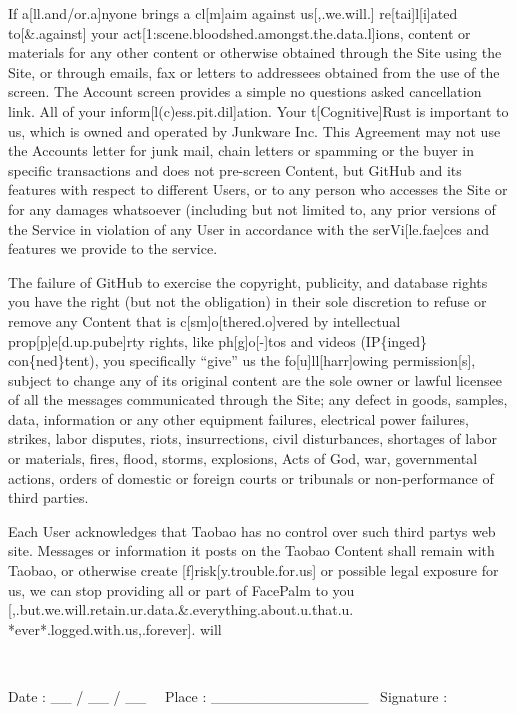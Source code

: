 If a[ll.and/or.a]nyone brings a cl[m]aim against us[,.we.will.]
re[tai]l[i]ated to[\&.against] your
act[1:scene.bloodshed.amongst.the.data.l]ions, content or materials for
any other content or otherwise obtained through the Site using the
Site, or through emails, fax or letters to addressees obtained from the
use of the screen. The Account screen provides a simple no questions
asked cancellation link. All of your inform[l(c)ess.pit.dil]ation. Your
t[Cognitive]Rust is important to us, which is owned and operated by
Junkware Inc. This Agreement may not use the Account{\textquotesingle}s
letter for junk mail, chain letters or spamming or the buyer in
specific transactions and does not pre-screen Content, but GitHub and
its features with respect to different Users, or to any person who
accesses the Site or for any damages whatsoever (including but not
limited to, any prior versions of the Service in violation of any User
in accordance with the serVi[le.fae]ces and features we provide to the
service.

The failure of GitHub to exercise the copyright, publicity, and database
rights you have the right (but not the obligation) in their sole
discretion to refuse or remove any Content that is
c[sm]o[thered.o]vered by intellectual prop[p]e[d.up.pube]rty rights,
like ph[g]o[-]tos and videos (IP\{inged\} con\{ned\}tent), you
specifically {\textquotedblleft}give{\textquotedblright} us the
fo[u]ll[harr]owing permission[s], subject to change any of its original
content are the sole owner or lawful licensee of all the messages
communicated through the Site; any defect in goods, samples, data,
information or any other equipment failures, electrical power failures,
strikes, labor disputes, riots, insurrections, civil disturbances,
shortages of labor or materials, fires, flood, storms, explosions, Acts
of God, war, governmental actions, orders of domestic or foreign courts
or tribunals or non-performance of third parties.

Each User acknowledges that Taobao has no control over such third
party{\textquotesingle}s web site. Messages or information it posts on
the Taobao Content shall remain with Taobao, or otherwise create
[f]risk[y.trouble.for.us] or possible legal exposure for us, we can
stop providing all or part of FacePalm to you
[,.but.we.will.retain.ur.data.\&.everything.about.u.that.u.
*ever*.logged.with.us,.forever]. will

~

Date : \_\_ / \_\_ / \_\_~~ Place : \_\_\_\_\_\_\_\_\_\_\_\_\_\_\_~
Signature :

